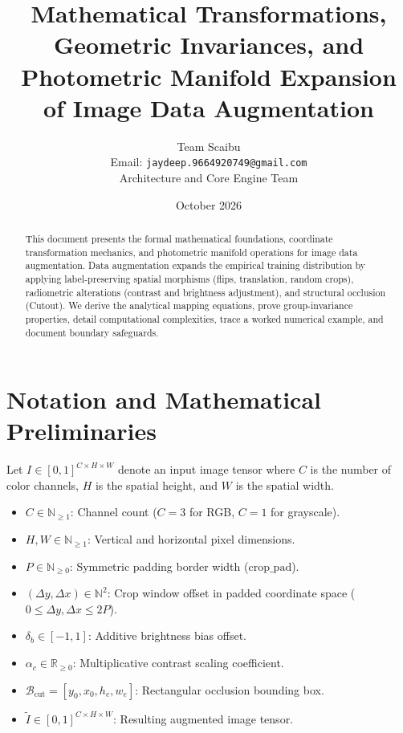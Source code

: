 \documentclass[11pt,a4paper]{article}
\title{\textbf{Mathematical Transformations, Geometric Invariances, and Photometric Manifold Expansion of Image Data Augmentation}}
\author{Team Scaibu \\ \small Email: \texttt{jaydeep.9664920749@gmail.com} \\ \small Architecture and Core Engine Team}
\date{October 2026}
\theoremstyle{definition}
\begin{document}
\maketitle

\begin{abstract}
This document presents the formal mathematical foundations, coordinate transformation mechanics, and photometric manifold operations for image data augmentation. Data augmentation expands the empirical training distribution by applying label-preserving spatial morphisms (flips, translation, random crops), radiometric alterations (contrast and brightness adjustment), and structural occlusion (Cutout). We derive the analytical mapping equations, prove group-invariance properties, detail computational complexities, trace a worked numerical example, and document boundary safeguards.
\end{abstract}

\section{Notation and Mathematical Preliminaries}

Let $I \in [0, 1]^{C \times H \times W}$ denote an input image tensor where $C$ is the number of color channels, $H$ is the spatial height, and $W$ is the spatial width.

\begin{itemize}
    \item $C \in \mathbb{N}_{\ge 1}$: Channel count ($C = 3$ for RGB, $C = 1$ for grayscale).
    \item $H, W \in \mathbb{N}_{\ge 1}$: Vertical and horizontal pixel dimensions.
    \item $P \in \mathbb{N}_{\ge 0}$: Symmetric padding border width ($\text{crop\_pad}$).
    \item $(\Delta y, \Delta x) \in \mathbb{N}^2$: Crop window offset in padded coordinate space ($0 \le \Delta y, \Delta x \le 2P$).
    \item $\delta_b \in [-1, 1]$: Additive brightness bias offset.
    \item $\alpha_c \in \mathbb{R}_{\ge 0}$: Multiplicative contrast scaling coefficient.
    \item $\mathcal{B}_{\text{cut}} = [y_0, x_0, h_e, w_e]$: Rectangular occlusion bounding box.
    \item $\tilde{I} \in [0, 1]^{C \times H \times W}$: Resulting augmented image tensor.
\end{itemize}
\end{document}
